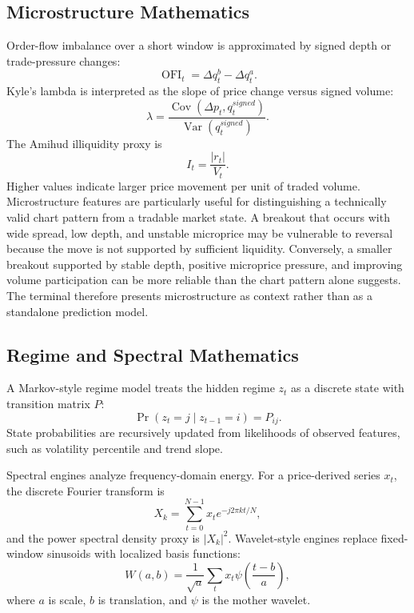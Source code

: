 \documentclass[conference]{IEEEtran}
\begin{document}
\subsection{Microstructure Mathematics}

Order-flow imbalance over a short window is approximated by signed depth or
trade-pressure changes:
\begin{equation}
\operatorname{OFI}_t = \Delta q_t^b - \Delta q_t^a.
\end{equation}
Kyle's lambda is interpreted as the slope of price change versus signed
volume:
\begin{equation}
\lambda = \frac{\operatorname{Cov}(\Delta p_t, q_t^{signed})}
{\operatorname{Var}(q_t^{signed})}.
\end{equation}
The Amihud illiquidity proxy is
\begin{equation}
I_t = \frac{|r_t|}{V_t}.
\end{equation}
Higher values indicate larger price movement per unit of traded volume.
Microstructure features are particularly useful for distinguishing a
technically valid chart pattern from a tradable market state. A breakout that
occurs with wide spread, low depth, and unstable microprice may be vulnerable
to reversal because the move is not supported by sufficient liquidity.
Conversely, a smaller breakout supported by stable depth, positive
microprice pressure, and improving volume participation can be more reliable
than the chart pattern alone suggests. The terminal therefore presents
microstructure as context rather than as a standalone prediction model.

\subsection{Regime and Spectral Mathematics}

A Markov-style regime model treats the hidden regime $z_t$ as a discrete
state with transition matrix $P$:
\begin{equation}
\Pr(z_t=j \mid z_{t-1}=i)=P_{ij}.
\end{equation}
State probabilities are recursively updated from likelihoods of observed
features, such as volatility percentile and trend slope.

Spectral engines analyze frequency-domain energy. For a price-derived series
$x_t$, the discrete Fourier transform is
\begin{equation}
X_k=\sum_{t=0}^{N-1}x_t e^{-j2\pi kt/N},
\end{equation}
and the power spectral density proxy is $|X_k|^2$. Wavelet-style engines
replace fixed-window sinusoids with localized basis functions:
\begin{equation}
W(a,b)=\frac{1}{\sqrt{a}}\sum_t x_t \psi\left(\frac{t-b}{a}\right),
\end{equation}
where $a$ is scale, $b$ is translation, and $\psi$ is the mother wavelet.
\end{document}
